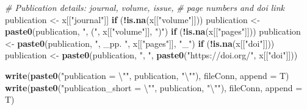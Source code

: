 \documentclass[12pt,]{book}
\newenvironment{Shaded}{\begin{snugshade}}{\end{snugshade}}
\newcommand{\KeywordTok}[1]{\textcolor[rgb]{0.13,0.29,0.53}{\textbf{#1}}}
\newcommand{\DataTypeTok}[1]{\textcolor[rgb]{0.13,0.29,0.53}{#1}}
\newcommand{\CharTok}[1]{\textcolor[rgb]{0.31,0.60,0.02}{#1}}
\newcommand{\StringTok}[1]{\textcolor[rgb]{0.31,0.60,0.02}{#1}}
\newcommand{\CommentTok}[1]{\textcolor[rgb]{0.56,0.35,0.01}{\textit{#1}}}
\newcommand{\ControlFlowTok}[1]{\textcolor[rgb]{0.13,0.29,0.53}{\textbf{#1}}}
\newcommand{\OperatorTok}[1]{\textcolor[rgb]{0.81,0.36,0.00}{\textbf{#1}}}
\newcommand{\NormalTok}[1]{#1}
\theoremstyle{definition}
\theoremstyle{definition}
\theoremstyle{definition}
\theoremstyle{remark}
\begin{document}
\begin{Shaded}
\begin{Highlighting}[]
{{{{{{                             \CommentTok{# Publication details: journal, volume, issue, }
                             \CommentTok{# page numbers and doi link}
\NormalTok{                             publication <-}\StringTok{ }\NormalTok{x[[}\StringTok{"journal"}\NormalTok{]]}
                             \ControlFlowTok{if}\NormalTok{ (}\OperatorTok{!}\KeywordTok{is.na}\NormalTok{(x[[}\StringTok{"volume"}\NormalTok{]]))}
\NormalTok{                             publication <-}\StringTok{ }\KeywordTok{paste0}\NormalTok{(publication,}
                             \StringTok{", ("}\NormalTok{, x[[}\StringTok{"volume"}\NormalTok{]], }\StringTok{")"}\NormalTok{)}
                             \ControlFlowTok{if}\NormalTok{ (}\OperatorTok{!}\KeywordTok{is.na}\NormalTok{(x[[}\StringTok{"pages"}\NormalTok{]]))}
\NormalTok{                             publication <-}\StringTok{ }\KeywordTok{paste0}\NormalTok{(publication,}
                             \StringTok{", _pp. "}\NormalTok{, x[[}\StringTok{"pages"}\NormalTok{]], }\StringTok{"_"}\NormalTok{)}
                             \ControlFlowTok{if}\NormalTok{ (}\OperatorTok{!}\KeywordTok{is.na}\NormalTok{(x[[}\StringTok{"doi"}\NormalTok{]]))}
\NormalTok{                             publication <-}\StringTok{ }\KeywordTok{paste0}\NormalTok{(publication,}
                             \StringTok{", "}\NormalTok{,}
                             \KeywordTok{paste0}\NormalTok{(}\StringTok{"https://doi.org/"}\NormalTok{,}
\NormalTok{                             x[[}\StringTok{"doi"}\NormalTok{]]))}
                             
                             \KeywordTok{write}\NormalTok{(}\KeywordTok{paste0}\NormalTok{(}\StringTok{"publication = }\CharTok{\textbackslash{}"}\StringTok{"}\NormalTok{, publication, }\StringTok{"}\CharTok{\textbackslash{}"}\StringTok{"}\NormalTok{),}
\NormalTok{                             fileConn,}
                             \DataTypeTok{append =}\NormalTok{ T)}
                             \KeywordTok{write}\NormalTok{(}\KeywordTok{paste0}\NormalTok{(}\StringTok{"publication_short = }\CharTok{\textbackslash{}"}\StringTok{"}\NormalTok{,}
\NormalTok{                             publication,}
                             \StringTok{"}\CharTok{\textbackslash{}"}\StringTok{"}\NormalTok{),}
\NormalTok{                             fileConn,}
                             \DataTypeTok{append =}\NormalTok{ T)}
                             
}}}}}}
\end{Highlighting}
\end{Shaded}
\end{document}
